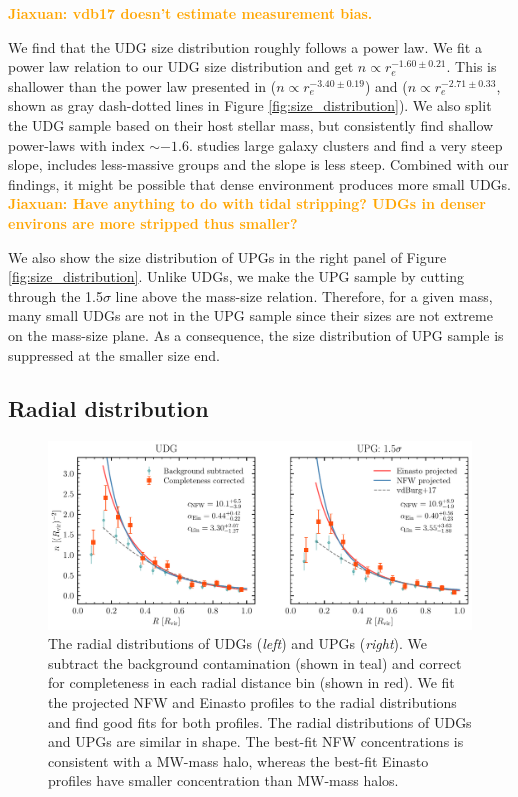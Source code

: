 \documentclass[twocolumn,astrosymb,twocolappendix]{aastex631}
\newcommand{\jiaxuan}[1]{\textcolor{orange}{\textbf{Jiaxuan: #1}}}
\begin{document}
\begin{CJK*}{UTF8}{gbsn}
\jiaxuan{vdb17 doesn't estimate measurement bias.}

We find that the UDG size distribution roughly follows a power law. We fit a power law relation to our UDG size distribution and get $n\propto r_e^{-1.60\pm0.21}$. This is shallower than the power law presented in \citet{vdBurg2016} ($n\propto r_e^{-3.40\pm0.19}$) and \citet{vdBurg2017} ($n\propto r_e^{-2.71\pm0.33}$, shown as gray dash-dotted lines in Figure \ref{fig:size_distribution}). We also split the UDG sample based on their host stellar mass, but consistently find shallow power-laws with index $\sim -1.6$. \citet{vdBurg2016} studies large galaxy clusters and find a very steep slope, \citet{vdBurg2017} includes less-massive groups and the slope is less steep. Combined with our findings, it might be possible that dense environment produces more small UDGs. \jiaxuan{Have anything to do with tidal stripping? UDGs in denser environs are more stripped thus smaller?}

We also show the size distribution of UPGs in the right panel of Figure \ref{fig:size_distribution}. Unlike UDGs, we make the UPG sample by cutting through the 1.5$\sigma$ line above the mass-size relation. Therefore, for a given mass, many small UDGs are not in the UPG sample since their sizes are not extreme on the mass-size plane. As a consequence, the size distribution of UPG sample is suppressed at the smaller size end. 

\subsection{Radial distribution}\label{sec:radial_distr}

\begin{figure}
	\vbox{ 
		\centering
		\includegraphics[width=1\linewidth]{radial_distribution.pdf}
	}
    \caption{The radial distributions of UDGs (\textit{left}) and UPGs (\textit{right}). We subtract the background contamination (shown in teal) and correct for completeness in each radial distance bin (shown in red). We fit the projected NFW and Einasto profiles to the radial distributions and find good fits for both profiles. The radial distributions of UDGs and UPGs are similar in shape. The best-fit NFW concentrations is consistent with a MW-mass halo, whereas the best-fit Einasto profiles have smaller concentration than MW-mass halos.}
    \label{fig:radial_distribution}
\end{figure}



\end{CJK*}
\end{document}
